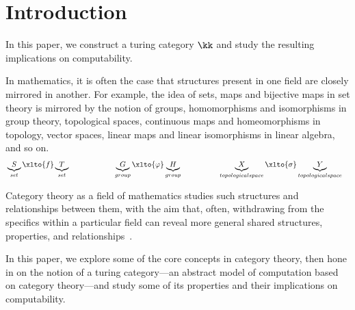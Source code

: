 {}%
\section*{Introduction}

In this paper, we construct a turing category
$\kk$ and study the resulting implications
on computability.

In mathematics, it is often the case that structures
present in one field are closely mirrored in another.
For example, the idea of sets, maps and bijective maps
in set theory is mirrored by the notion of
groups, homomorphisms and isomorphisms in group theory,
topological spaces, continuous maps and homeomorphisms
in topology, vector spaces, linear maps and linear isomorphisms
in linear algebra, and so on.
\begin{alignat*}{5}
  &\underbrace{S}_{set} \xlto{f} \underbrace{T}_{set}
  \qquad&&\qquad
  &&\underbrace{G}_{group} \xlto{\varphi} \underbrace{H}_{group}
  \qquad&&\qquad
  \underbrace{X}_{topological space} \xlto{\sigma} \underbrace{Y}_{topological space}
\end{alignat*}

Category theory as a field of mathematics studies such structures
and relationships between them, with the aim that,
often, withdrawing from the specifics within a particular field
can reveal more general shared structures, properties, and relationships~\cite{BRADLEY}.

In this paper, we explore some of the core concepts in category theory,
then hone in on the notion of a turing category---an abstract
model of computation based on category theory---and study some
of its properties and their implications on computability.

